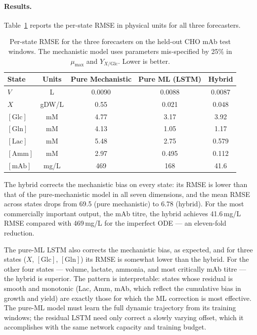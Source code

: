 \paragraph{Results.}
Table~\ref{tab:hybrid_rmse} reports the per-state RMSE in physical units
for all three forecasters.

\begin{table}[ht]
\centering
\caption{Per-state RMSE for the three forecasters on the held-out CHO mAb
  test windows.  The mechanistic model uses parameters mis-specified by
  25\% in $\mu_{\max}$ and $Y_{X/\mathrm{Glc}}$.
  Lower is better.}
\label{tab:hybrid_rmse}
\begin{tabular}{lcccc}
\toprule
State & Units & Pure Mechanistic & Pure ML (LSTM) & Hybrid \\
\midrule
$V$                  & L       & 0.0090 & 0.0088 & 0.0087 \\
$X$                  & gDW/L   & 0.55   & 0.021  & 0.048  \\
$[\mathrm{Glc}]$     & mM      & 4.77   & 3.17   & 3.92   \\
$[\mathrm{Gln}]$     & mM      & 4.13   & 1.05   & 1.17   \\
$[\mathrm{Lac}]$     & mM      & 5.48   & 2.75   & 0.579  \\
$[\mathrm{Amm}]$     & mM      & 2.97   & 0.495  & 0.112  \\
$[\mathrm{mAb}]$     & mg/L    & 469    & 168    & 41.6   \\
\bottomrule
\end{tabular}
\end{table}

The hybrid corrects the mechanistic bias on every state: its RMSE is lower
than that of the pure-mechanistic model in all seven dimensions, and the
mean RMSE across states drops from 69.5 (pure mechanistic) to 6.78 (hybrid).
For the most commercially important output, the mAb titre, the hybrid
achieves 41.6\,mg/L RMSE compared with 469\,mg/L for the imperfect ODE ---
an eleven-fold reduction.

The pure-ML LSTM also corrects the mechanistic bias, as expected, and for
three states ($X$, $[\mathrm{Glc}]$, $[\mathrm{Gln}]$) its RMSE is somewhat
lower than the hybrid.  For the other four states --- volume, lactate, ammonia,
and most critically mAb titre --- the hybrid is superior.  The pattern is
interpretable: states whose residual is smooth and monotonic (Lac, Amm, mAb,
which reflect the cumulative bias in growth and yield) are exactly those for
which the ML correction is most effective.  The pure-ML model must learn the
full dynamic trajectory from its training windows; the residual LSTM need only
correct a slowly varying offset, which it accomplishes with the same network
capacity and training budget.

